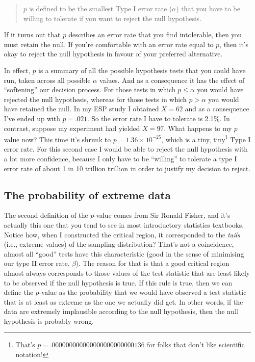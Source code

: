 \documentclass[
]{book}
\begin{document}
\begin{quote}
\(p\) is defined to be the smallest Type I error rate (\(\alpha\)) that you have to be willing to tolerate if you want to reject the null hypothesis.
\end{quote}

If it turns out that \(p\) describes an error rate that you find intolerable, then you must retain the null. If you're comfortable with an error rate equal to \(p\), then it's okay to reject the null hypothesis in favour of your preferred alternative.

In effect, \(p\) is a summary of all the possible hypothesis tests that you could have run, taken across all possible \(\alpha\) values. And as a consequence it has the effect of ``softening'' our decision process. For those tests in which \(p \leq \alpha\) you would have rejected the null hypothesis, whereas for those tests in which \(p > \alpha\) you would have retained the null. In my ESP study I obtained \(X=62\) and as a consequence I've ended up with \(p = .021\). So the error rate I have to tolerate is 2.1\%. In contrast, suppose my experiment had yielded \(X=97\). What happens to my \(p\) value now? This time it's shrunk to \(p = 1.36 \times 10^{-25}\), which is a tiny, tiny\footnote{That's \(p = .000000000000000000000000136\) for folks that don't like scientific notation!} Type I error rate. For this second case I would be able to reject the null hypothesis with a lot more confidence, because I only have to be ``willing'' to tolerate a type I error rate of about 1 in 10 trillion trillion in order to justify my decision to reject.

\hypertarget{the-probability-of-extreme-data}{%
\subsection{The probability of extreme data}\label{the-probability-of-extreme-data}}

The second definition of the \(p\)-value comes from Sir Ronald Fisher, and it's actually this one that you tend to see in most introductory statistics textbooks. Notice how, when I constructed the critical region, it corresponded to the \emph{tails} (i.e., extreme values) of the sampling distribution? That's not a coincidence, almost all ``good'' tests have this characteristic (good in the sense of minimising our type II error rate, \(\beta\)). The reason for that is that a good critical region almost always corresponds to those values of the test statistic that are least likely to be observed if the null hypothesis is true. If this rule is true, then we can define the \(p\)-value as the probability that we would have observed a test statistic that is at least as extreme as the one we actually did get. In other words, if the data are extremely implausible according to the null hypothesis, then the null hypothesis is probably wrong.
\end{document}
